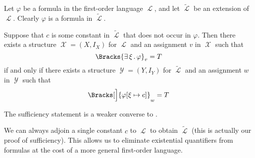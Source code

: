 \begin{proposition}\label{thm:existential_quantifier_removal}
  Let \( \varphi \) be a formula in the first-order language \( \mscrL \), and let \( \widetilde \mscrL \) be an extension of \( \mscrL \). Clearly \( \varphi \) is a formula in \( \widetilde \mscrL \).

  Suppose that \( c \) is some constant in \( \widetilde \mscrL \) that does not occur in \( \varphi \). Then there exists a structure \( \mscrX = (X, I_X) \) for \( \mscrL \) and an assignment \( v \) in \( \mscrX \) such that
  \begin{equation*}
    \Bracks{\qexists \xi \varphi}_v = T
  \end{equation*}
  if and only if there exists a structure \( \mscrY = (Y, I_Y) \) for \( \widetilde \mscrL \) and an assignment \( w \) in \( \mscrY \) such that
  \begin{equation*}
    \Bracks[\Big]{\varphi[\xi \mapsto c]}_w = T
  \end{equation*}
\end{proposition}
\begin{comments}
  \item The sufficiency statement is a weaker converse to .
  \item We can always adjoin a single constant \( c \) to \( \mscrL \) to obtain \( \widetilde \mscrL \) (this is actually our proof of sufficiency). This allows us to eliminate existential quantifiers from formulas at the cost of a more general first-order language.
\end{comments}
